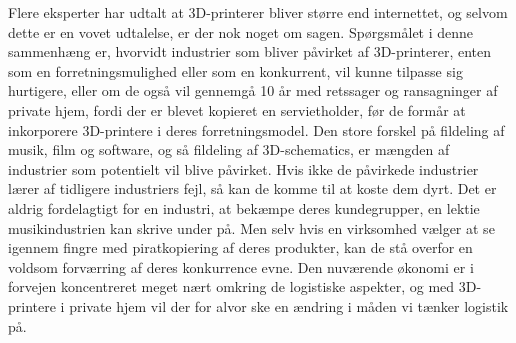 Flere eksperter har udtalt at 3D-printerer bliver større end internettet\cite{musik5}, og selvom dette er en vovet udtalelse, er der nok noget om sagen. Spørgsmålet i denne sammenhæng er, hvorvidt industrier som bliver påvirket af 3D-printerer, enten som en forretningsmulighed eller som en konkurrent, vil kunne tilpasse sig hurtigere, eller om de også vil gennemgå 10 år med retssager og ransagninger af private hjem, fordi der er blevet kopieret en servietholder, før de formår at inkorporere 3D-printere i deres forretningsmodel.
Den store forskel på fildeling af musik, film og software, og så fildeling af 3D-schematics, er mængden af industrier som potentielt vil blive påvirket. Hvis ikke de påvirkede industrier lærer af tidligere industriers fejl, så kan de komme til at koste dem dyrt. Det er aldrig fordelagtigt for en industri, at bekæmpe deres kundegrupper, en lektie musikindustrien kan skrive under på. Men selv hvis en virksomhed vælger at se igennem fingre med piratkopiering af deres produkter, kan de stå overfor en voldsom forværring af deres konkurrence evne.
Den nuværende økonomi er i forvejen koncentreret meget nært omkring de logistiske aspekter, og med 3D-printere i private hjem vil der for alvor ske en ændring i måden vi tænker logistik på.
